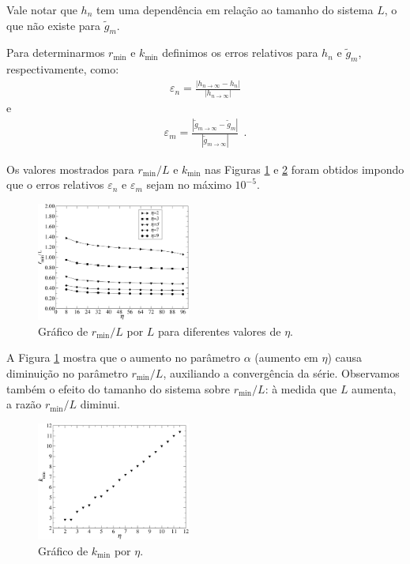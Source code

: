 \documentclass[twocolumn,a4,11pt]{article}
\begin{document}
Vale notar que $h_{n}$ tem uma dependência em relação ao tamanho do sistema $L$, o que não existe para $\tilde{g}_{m}$.

Para determinarmos $r_{\min}$ e $k_{\min}$ definimos os erros relativos para $h_{n}$ e $\tilde{g}_{m}$, respectivamente, como:
\begin{eqnarray*}
\varepsilon_{n} = \frac{\left| h_{n \rightarrow \infty}-h_{n} \right|}{|h_{n \rightarrow \infty}|}
\end{eqnarray*}
e
\begin{eqnarray*}
\varepsilon_{m} = \frac{\left| \tilde{g}_{m \rightarrow \infty}-\tilde{g}_{m} \right|}{|\tilde{g}_{m \rightarrow \infty}|} ~~ \text{.}
\end{eqnarray*}

Os valores mostrados para $r_{\min}/L$ e $k_{\min}$ nas Figuras \ref{rmax_L} e \ref{kmax_eta} foram obtidos impondo que o erros relativos $\varepsilon_{n}$ e $\varepsilon_{m}$ sejam no máximo $10^{-5}$.

\begin{figure}[!ht]
\centering
\includegraphics[width=0.45\textwidth]{rmin}
\renewcommand{\figurename}{Figura}
\caption{ {\small Gráfico de $r_{\min}/L $ por $L$ para diferentes valores de $\eta$.}}
\label{rmax_L}
\end{figure}

A Figura \ref{rmax_L} mostra que o aumento no parâmetro $\alpha$ (aumento em $\eta$) causa diminuição no parâmetro $r_{\min}/L$, auxiliando a convergência da série. Observamos também o efeito do tamanho do sistema sobre $r_{\min}/L$: à medida que $L$ aumenta, a razão $r_{\min}/L$ diminui.

\begin{figure}[!b]
\centering
\includegraphics[width=0.45\textwidth]{kmin}
\renewcommand{\figurename}{Figura}
\caption{ {\small Gráfico de $k_{\min}$ por $\eta$.}}
\label{kmax_eta}
\end{figure}
\end{document}
